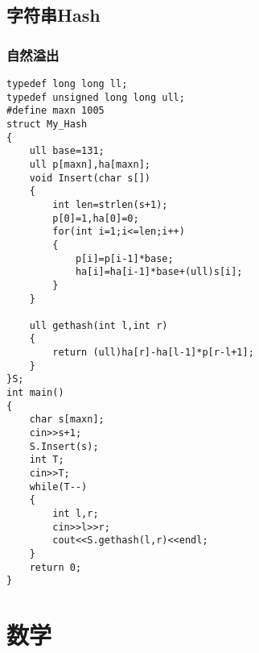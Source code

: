 \subsection{字符串Hash}
\subsubsection{自然溢出}
\begin{lstlisting}
typedef long long ll;
typedef unsigned long long ull;
#define maxn 1005
struct My_Hash
{
	ull base=131;
	ull p[maxn],ha[maxn];
	void Insert(char s[])
	{
		int len=strlen(s+1);
		p[0]=1,ha[0]=0;
		for(int i=1;i<=len;i++)
		{
			p[i]=p[i-1]*base;
			ha[i]=ha[i-1]*base+(ull)s[i];
		}
	}
	
	ull gethash(int l,int r)
	{
		return (ull)ha[r]-ha[l-1]*p[r-l+1];
	}
}S;
int main()
{
	char s[maxn];
	cin>>s+1;
	S.Insert(s);
	int T;
	cin>>T;
	while(T--)
	{
		int l,r;
		cin>>l>>r;
		cout<<S.gethash(l,r)<<endl;
	}
	return 0;
}
\end{lstlisting}


\section{数学}
